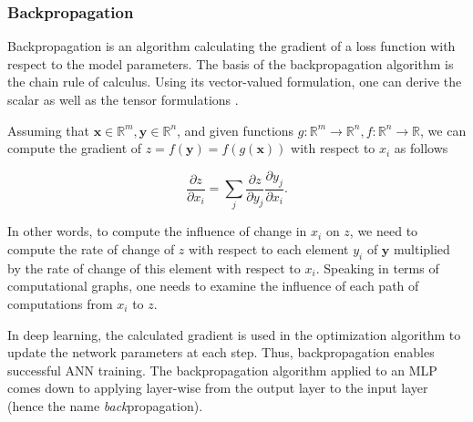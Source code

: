 \subsubsection{Backpropagation}
\label{sec:backpropagation}

Backpropagation is an algorithm calculating the gradient of a loss function with respect to the model parameters. The basis of the backpropagation algorithm is the chain rule of calculus. Using its vector-valued formulation, one can derive the scalar as well as the tensor formulations \cite{Goodfellow-et-al-2016}.

Assuming that $\pmb{x} \in \mathbb{R}^m, \pmb{y} \in \mathbb{R}^n$, and given functions $g: \mathbb{R}^m \rightarrow \mathbb{R}^n, f: \mathbb{R}^n \rightarrow \mathbb{R}$, we can compute the gradient of $z = f(\pmb{y}) = f(g(\pmb{x}))$ with respect to $x_i$ as follows

\begin{equation}
  \frac{\partial z}{\partial x_i} = \sum \limits_j \frac{\partial z}{\partial y_j} \frac{\partial y_j}{\partial x_i}.
  \label{eq:chain_rule_of_calculus}
\end{equation}

In other words, to compute the influence of change in $x_i$ on $z$, we need to compute the rate of change of $z$ with respect to each element $y_i$ of $\pmb{y}$ multiplied by the rate of change of this element with respect to $x_i$. Speaking in terms of computational graphs, one needs to examine the influence of each path of computations from $x_i$ to $z$.

In deep learning, the calculated gradient is used in the optimization algorithm to update the network parameters at each step. Thus, backpropagation enables successful \ac{ANN} training. The backpropagation algorithm applied to an \ac{MLP} comes down to applying  layer-wise from the output layer to the input layer (hence the name \emph{back}propagation).


